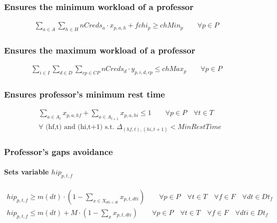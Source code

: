 \subsubsection{Ensures the minimum workload of a professor}
\begin{eqnarray}
\sum\limits_{a \in A}\sum\limits_{h \in H} nCreds_{a} \cdot x_{p,a,h} + fchi_{p} \ge chMin_{p} \nonumber \qquad 
\forall p \in P \quad
\end{eqnarray}

\subsubsection{Ensures the maximum workload of a professor}
\begin{eqnarray}
\sum\limits_{i \in I}\sum\limits_{d \in D}\sum\limits_{cp \in CP} nCreds_{d} \cdot y_{p,i,d,cp} \le chMax_{p} \nonumber \qquad 
\forall p \in P \quad
\end{eqnarray}

\subsubsection{Ensures professor's minimum rest time}
\begin{eqnarray}
\sum\limits_{a \in A_{t}} x_{p,a,hf} + \sum\limits_{a \in A_{t+1}} x_{p,a,hi} \le 1 \nonumber \qquad 
\forall p \in P \quad
\forall t \in T \\
\forall \mbox{ (hf,t) and (hi,t+1) s.t. } \Delta_{(hf,t), (hi,t+1)} < MinRestTime
\end{eqnarray}

	
	
\subsubsection{Professor's gaps avoidance}
	
\paragraph{Sets variable $hip_{p,t,f}$}
\begin{eqnarray}
hip_{p,t,f} \geq m(dt) \cdot ( 1 - \sum\limits_{x \in X_{dti<dt}} x_{p,t,dti} ) \nonumber \qquad
\forall p \in P \quad
\forall t \in T \quad
\forall f \in F \quad
\forall dt \in Dt_{f}
\end{eqnarray}
\begin{eqnarray}
hip_{p,t,f} \leq m(dt) + M \cdot ( 1 - \sum\limits_{x} x_{p,t,dti} ) \nonumber \qquad
\forall p \in P \quad
\forall t \in T \quad
\forall f \in F \quad
\forall dti \in Dt_{f}
\end{eqnarray}

